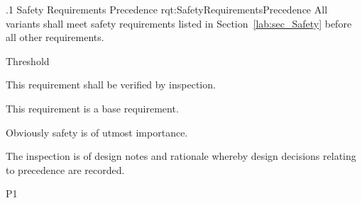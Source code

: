 \ONERQMTV
{\RqtNumberBase.1}
{Safety Requirements Precedence}
{rqt:SafetyRequirementsPrecedence}
{All \ThisSystem variants shall meet safety requirements listed in Section~\ref{lab:sec_Safety} before all other requirements.}
{
	\item [Phase 1] Threshold
}
{This requirement shall be verified by inspection.}
{
	\item [N/A] This requirement is a base requirement.
}
{
	\item Obviously safety is of utmost importance.
	\item The inspection is of design notes and rationale whereby design decisions relating to precedence are recorded.
}
{P1}


